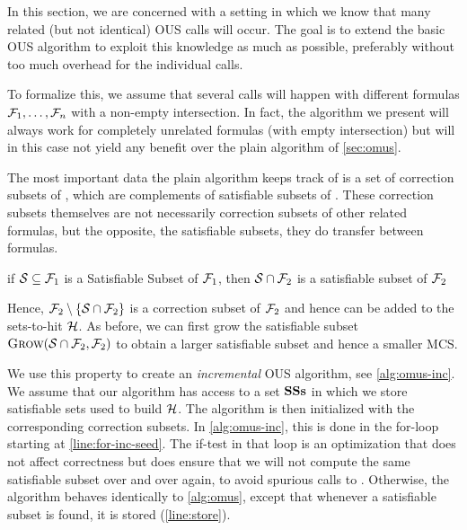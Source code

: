 In this section, we are concerned with a setting in which we know that many related (but not identical) OUS calls will occur. The goal is to extend the basic OUS algorithm to exploit this knowledge as much as possible, preferably without too much overhead for the individual calls. 

\newcommand\satsets{\mm{\mathbf{SSs}}}
\newcommand\fall{\mm{\formula_{\mathit{all}}}}
To formalize this, we assume that several \omus calls will happen with different formulas $\mathcal{F} _1,\dots,\mathcal{F} _n$ with a non-empty intersection. In fact, the algorithm we present will always work for completely unrelated formulas (with empty intersection) but will in this case not yield any benefit over the plain \omus algorithm of \cref{sec:omus}. 

The most important data the plain \omus algorithm keeps track of is a set of correction subsets of \formula, which are complements of satisfiable subsets of \formula.
These correction subsets themselves are not necessarily correction subsets of other related formulas, but the opposite, the satisfiable subsets, they do transfer between formulas.

\begin{proposition}\label{prop:ss}
if $\mathcal{S} \subseteq \mathcal{F} _1$ is a Satisfiable Subset of $\mathcal{F} _1$, then $\mathcal{S}\cap \mathcal{F} _2$ is a satisfiable subset of $\mathcal{F} _2$
\end{proposition}
Hence, $\mathcal{F} _2 \setminus \{\mathcal{S}\cap \mathcal{F} _2\}$ is a correction subset of $\mathcal{F} _2$ and hence can be added to the sets-to-hit $\mathcal{H} $. As before, we can first grow the satisfiable subset $\textsc{Grow}(\mathcal{S}\cap \mathcal{F} _2,\mathcal{F} _2)$ to obtain a larger satisfiable subset and hence a smaller MCS.

We use this property to create an \textit{incremental} OUS algorithm, see \cref{alg:omus-inc}. We assume that our algorithm has access to a set $\satsets$ in which we store satisfiable sets used to build $\mathcal{H} $. The \omus algorithm is then initialized with the corresponding correction subsets. 
In  \cref{alg:omus-inc}, this is done in the for-loop starting at \cref{line:for-inc-seed}. The if-test in that loop is an optimization that does not affect correctness but does ensure that we will not compute the same satisfiable subset over and over again, to avoid spurious calls to \grow. 
Otherwise, the algorithm behaves identically to \cref{alg:omus}, except that whenever a satisfiable subset is found, it is stored (\cref{line:store}). 
 


